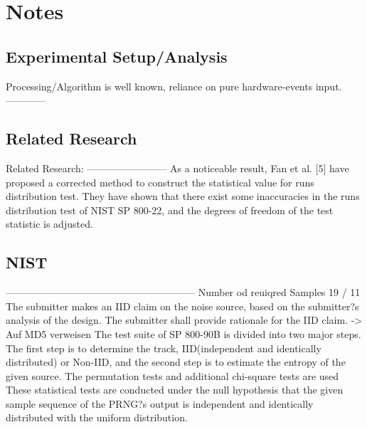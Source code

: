 \chapter{Notes}
\label{cha:notes}

\section{Experimental Setup/Analysis}
Processing/Algorithm is well known, reliance on pure hardware-events input.
------------

\section{Related Research}
 Related Research: 
 ------------------------
 As a noticeable result, Fan et al. [5]
 have proposed a corrected method to construct the statistical
 value for runs distribution test. They have shown that there
 exist some inaccuracies in the runs distribution test of NIST
 SP 800-22, and the degrees of freedom of the test statistic
 is adjusted. 
  \cite{kangadditional}


\section{NIST}



---------------------------------------------------------
 Number od reuiqred Samples 19 / 11 \cite{turan2018nist} 
The submitter makes an IID claim on the noise source, based on the submitter?s analysis of the design. The submitter shall provide rationale for the IID claim. \cite{turan2018nist} -> Auf MD5 verweisen
 The test suite of SP 800-90B is divided into two major steps. The first step is to determine the track, IID(independent and identically distributed) or Non-IID, and the second step is to estimate the entropy of the given source. The permutation tests and additional chi-square tests are used \cite{kangadditional}
These statistical tests are conducted under the null hypothesis that the
given sample sequence of the PRNG?s output is independent
and identically distributed with the uniform distribution.
 \cite{kangadditional}






